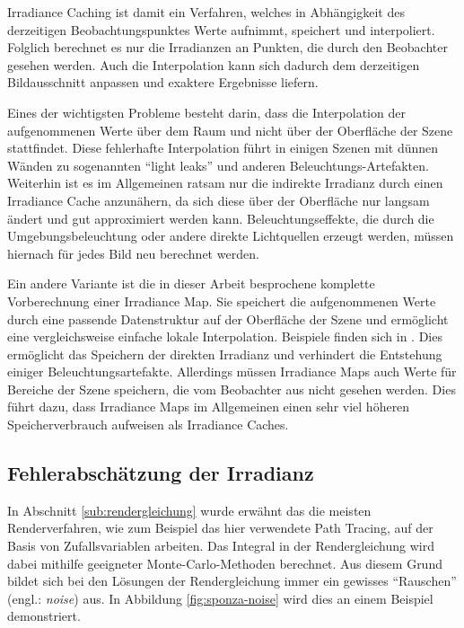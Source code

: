 		Irradiance Caching ist damit ein Verfahren, welches in Abhängigkeit des derzeitigen Beobachtungspunktes Werte aufnimmt, speichert und interpoliert.
		Folglich berechnet es nur die Irradianzen an Punkten, die durch den Beobachter gesehen werden.
		Auch die Interpolation kann sich dadurch dem derzeitigen Bildausschnitt anpassen und exaktere Ergebnisse liefern.

		Eines der wichtigsten Probleme besteht darin, dass die Interpolation der aufgenommenen Werte über dem Raum und nicht über der Oberfläche der Szene stattfindet.
		Diese fehlerhafte Interpolation führt in einigen Szenen mit dünnen Wänden zu sogenannten \enquote{light leaks} und anderen Beleuchtungs-Artefakten.
		Weiterhin ist es im Allgemeinen ratsam nur die indirekte Irradianz durch einen Irradiance Cache anzunähern, da sich diese über der Oberfläche nur langsam ändert und gut approximiert werden kann.
		Beleuchtungseffekte, die durch die Umgebungsbeleuchtung oder andere direkte Lichtquellen erzeugt werden, müssen hiernach für jedes Bild neu berechnet werden.

		Ein andere Variante ist die in dieser Arbeit besprochene komplette Vorberechnung einer Irradiance Map.
		Sie speichert die aufgenommenen Werte durch eine passende Datenstruktur auf der Oberfläche der Szene und ermöglicht eine vergleichsweise einfache lokale Interpolation.
		Beispiele finden sich in \cite{course-photon-map,gi-llde,gi-density-estimation}.
		Dies ermöglicht das Speichern der direkten Irradianz und verhindert die Entstehung einiger Beleuchtungsartefakte.
		Allerdings müssen Irradiance Maps auch Werte für Bereiche der Szene speichern, die vom Beobachter aus nicht gesehen werden.
		Dies führt dazu, dass Irradiance Maps im Allgemeinen einen sehr viel höheren Speicherverbrauch aufweisen als Irradiance Caches.


	\subsection{Fehlerabschätzung der Irradianz} %
	\label{sub:fehlerabschätzung_der_irradianz}

		In Abschnitt \ref{sub:rendergleichung} wurde erwähnt das die meisten Renderverfahren, wie zum Beispiel das hier verwendete Path Tracing, auf der Basis von Zufallsvariablen arbeiten.
		Das Integral in der Rendergleichung wird dabei mithilfe geeigneter Monte-Carlo-Methoden berechnet.
		Aus diesem Grund bildet sich bei den Lösungen der Rendergleichung immer ein gewisses \enquote{Rauschen} (engl.: \textit{noise}) aus.
		In Abbildung \ref{fig:sponza-noise} wird dies an einem Beispiel demonstriert.

